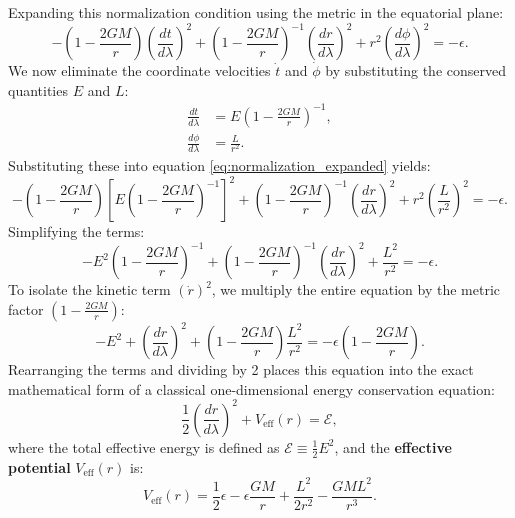 \documentclass[11pt, a4paper]{report}
\begin{document}
Expanding this normalization condition using the metric in the equatorial plane:
\begin{equation}
\label{eq:normalization_expanded}
-\left(1-\frac{2GM}{r}\right)\left(\frac{dt}{d\lambda}\right)^{2} + \left(1-\frac{2GM}{r}\right)^{-1}\left(\frac{dr}{d\lambda}\right)^{2} + r^{2}\left(\frac{d\phi}{d\lambda}\right)^{2} = -\epsilon.
\end{equation}
We now eliminate the coordinate velocities $\dot{t}$ and $\dot{\phi}$ by substituting the conserved quantities $E$ and $L$:
\begin{align}
\frac{dt}{d\lambda} &= E \left(1-\frac{2GM}{r}\right)^{-1}, \\
\frac{d\phi}{d\lambda} &= \frac{L}{r^{2}}.
\end{align}
Substituting these into equation \eqref{eq:normalization_expanded} yields:
\begin{equation}
-\left(1-\frac{2GM}{r}\right) \left[ E \left(1-\frac{2GM}{r}\right)^{-1} \right]^{2} + \left(1-\frac{2GM}{r}\right)^{-1}\left(\frac{dr}{d\lambda}\right)^{2} + r^{2}\left(\frac{L}{r^{2}}\right)^{2} = -\epsilon.
\end{equation}
Simplifying the terms:
\begin{equation}
-E^{2} \left(1-\frac{2GM}{r}\right)^{-1} + \left(1-\frac{2GM}{r}\right)^{-1}\left(\frac{dr}{d\lambda}\right)^{2} + \frac{L^{2}}{r^{2}} = -\epsilon.
\end{equation}
To isolate the kinetic term $(\dot{r})^{2}$, we multiply the entire equation by the metric factor $\left(1-\frac{2GM}{r}\right)$:
\begin{equation}
-E^{2} + \left(\frac{dr}{d\lambda}\right)^{2} + \left(1-\frac{2GM}{r}\right)\frac{L^{2}}{r^{2}} = -\epsilon \left(1-\frac{2GM}{r}\right).
\end{equation}
Rearranging the terms and dividing by 2 places this equation into the exact mathematical form of a classical one-dimensional energy conservation equation:
\begin{equation}
\label{eq:radial_energy_eq}
\frac{1}{2}\left(\frac{dr}{d\lambda}\right)^{2} + V_{\text{eff}}(r) = \mathcal{E},
\end{equation}
where the total effective energy is defined as $\mathcal{E} \equiv \frac{1}{2}E^{2}$, and the \textbf{effective potential} $V_{\text{eff}}(r)$ is:
\begin{equation}
\label{eq:effective_potential}
V_{\text{eff}}(r) = \frac{1}{2}\epsilon - \epsilon\frac{GM}{r} + \frac{L^{2}}{2r^{2}} - \frac{GML^{2}}{r^{3}}.
\end{equation}
\end{document}
